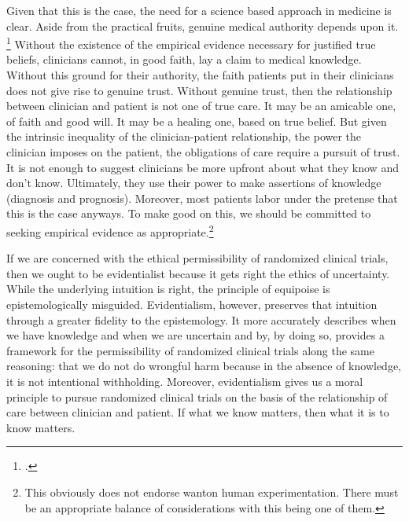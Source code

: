 \documentclass[letterpaper,notitlepage,12pt]{article}
\begin{document}
Given that this is the case, the need for a science based approach in medicine
is clear.
Aside from the practical fruits, genuine medical authority depends upon it.
\footcite[p. 354]{clifford_ethics_1886}
Without the existence of the empirical evidence necessary for justified true
beliefs, clinicians cannot, in good faith, lay a claim to medical knowledge.
Without this ground for their authority, the faith patients put in their
clinicians does not give rise to genuine trust.
Without genuine trust, then the relationship between clinician and patient is not
one of true care.
It may be an amicable one, of faith and good will.
It may be a healing one, based on true belief.
But given the intrinsic inequality of the clinician-patient relationship, the
power the clinician imposes on the patient, the obligations of care require a
pursuit of trust.
It is not enough to suggest clinicians be more upfront about what they know and
don't know.
Ultimately, they use their power to make assertions of knowledge (diagnosis and
  prognosis).
Moreover, most patients labor under the pretense that this is the case anyways.
To make good on this, we should be committed to seeking empirical evidence as
appropriate.\footnote{This obviously does not endorse wanton human
  experimentation. There must be an appropriate balance of considerations with
this being one of them.}

If we are concerned with the ethical permissibility of randomized clinical
trials, then we ought to be evidentialist because it gets right the ethics of
uncertainty.
While the underlying intuition is right, the principle of equipoise is
epistemologically misguided.
Evidentialism, however, preserves that intuition through a greater fidelity to
the epistemology.
It more accurately describes when we have knowledge and when we are uncertain and
by, by doing so, provides a framework for the permissibility of randomized
clinical trials along the same reasoning: that we do not do wrongful harm
because in the absence of knowledge, it is not intentional withholding.
Moreover, evidentialism gives us a moral principle to pursue randomized clinical
trials on the basis of the relationship of care between clinician and patient.
If what we know matters, then what it is to know matters.

\printbibliography
\end{document}
